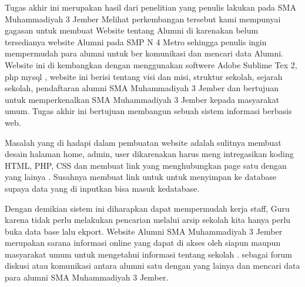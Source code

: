\documentclass{jtetiproposalskripsi}
\begin{document}
\cover

\approvalpage


\begin{abstractind}
Tugas akhir ini merupakan hasil dari penelitian yang penulis lakukan pada SMA Muhammadiyah 3 Jember Melihat perkembangan tersebut kami mempunyai gagasan untuk membuat Website tentang Alumni di karenakan belum tersedianya website Alumni pada SMP N 4 Metro sehingga penulis ingin mempermudah para alumni untuk ber komunikasi dan mencari data Alumni.
Website ini di kembangkan dengan menggunakan softwere Adobe Sublime Tex 2, php mysql , website ini berisi tentang visi dan misi, struktur sekolah, sejarah sekolah,  pendaftaran alumni SMA Muhammadiyah 3 Jember dan bertujuan untuk  memperkenalkan SMA Muhammadiyah 3 Jember kepada masyarakat umum. Tugas akhir ini bertujuan membangun sebuah sistem informasi  berbasis web.
 
Masalah yang di hadapi dalam pembuatan website adalah sulitnya membuat desain halaman home, admin, user dikarenakan harus meng intregasikan  koding HTML, PHP, CSS dan membuat link yang menghubungkan page satu dengan yang lainya .  Susahnya membuat link untuk  untuk menyimpan ke database supaya data yang di inputkan bisa  masuk kedatabase.
 
Dengan demikian sistem ini diharapkan dapat mempermudah kerja staff, Guru karena  tidak perlu melakukan pencarian melalui arsip sekolah kita hanya perlu buka data base lalu ekport. Website Alumni  SMA Muhammadiyah 3 Jember merupakan sarana informasi online yang dapat di akses oleh siapun maupun  masyarakat umum untuk mengetahui informasi tentang sekolah .  sebagai forum diskusi atau komunikasi antara alumni satu dengan yang lainya dan  mencari data para alumni SMA Muhammadiyah 3 Jember.



\bigskip

\end{abstractind}

\tableofcontents
{}
\clearpage{}\setcounter{page}{1}
\end{document}

